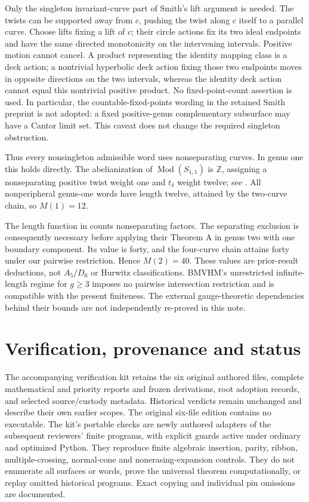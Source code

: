 \documentclass[11pt]{article}
\newcommand{\Mod}{\operatorname{Mod}}
\begin{document}
Only the singleton invariant-curve part of Smith's lift argument is needed. The twists can be supported away from $c$, pushing the twist along $c$ itself to a parallel curve. Choose lifts fixing a lift of $c$; their circle actions fix its two ideal endpoints and have the same directed monotonicity on the intervening intervals. Positive motion cannot cancel. A product representing the identity mapping class is a deck action; a nontrivial hyperbolic deck action fixing those two endpoints moves in opposite directions on the two intervals, whereas the identity deck action cannot equal this nontrivial positive product. No fixed-point-count assertion is used. In particular, the countable-fixed-points wording in the retained Smith preprint is not adopted: a fixed positive-genus complementary subsurface may have a Cantor limit set. This caveat does not change the required singleton obstruction.

Thus every nonsingleton admissible word uses nonseparating curves. In genus one this holds directly. The abelianization of $\Mod(S_{1,1})$ is $\mathbb Z$, assigning a nonseparating positive twist weight one and $t_\delta$ weight twelve; see \cite[Proposition 1 and its proof]{BMVHM}. All nonperipheral genus-one words have length twelve, attained by the two-curve chain, so $M(1)=12$.

The length function in \cite{BMVHM} counts nonseparating factors. The separating exclusion is consequently necessary before applying their Theorem A in genus two with one boundary component. Its value is forty, and the four-curve chain attains forty under our pairwise restriction. Hence $M(2)=40$. These values are prior-result deductions, not $A_5/D_6$ or Hurwitz classifications. BMVHM's unrestricted infinite-length regime for $g\geq3$ imposes no pairwise intersection restriction and is compatible with the present finiteness. The external gauge-theoretic dependencies behind their bounds are not independently re-proved in this note.

\section{Verification, provenance and status}
The accompanying verification kit retains the six original authored files, complete mathematical and priority reports and frozen derivations, root adoption records, and selected source/custody metadata. Historical verdicts remain unchanged and describe their own earlier scopes. The original six-file edition contains no executable. The kit's portable checks are newly authored adapters of the subsequent reviewers' finite programs, with explicit guards active under ordinary and optimized Python. They reproduce finite algebraic insertion, parity, ribbon, multiple-crossing, normal-cone and nonerasing-expansion controls. They do not enumerate all surfaces or words, prove the universal theorem computationally, or replay omitted historical programs. Exact copying and individual pin omissions are documented.
\end{document}
